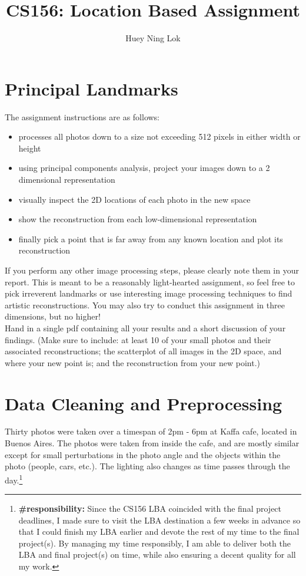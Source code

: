 \documentclass[11pt]{article}
\title{CS156: Location Based Assignment}
\author{Huey Ning Lok}
\providecommand{\tightlist}{%
      \setlength{\itemsep}{0pt}\setlength{\parskip}{0pt}}
\begin{document}
    
    
    \maketitle
    
    

    
    \section{Principal Landmarks}

The assignment instructions are as follows:

\begin{itemize}
\tightlist
\item
  processes all photos down to a size not exceeding 512 pixels in either
  width or height
\item
  using principal components analysis, project your images down to a 2
  dimensional representation
\item
  visually inspect the 2D locations of each photo in the new space
\item
  show the reconstruction from each low-dimensional representation
\item
  finally pick a point that is far away from any known location and plot
  its reconstruction
\end{itemize}

If you perform any other image processing steps, please clearly note
them in your report. This is meant to be a reasonably light-hearted
assignment, so feel free to pick irreverent landmarks or use interesting
image processing techniques to find artistic reconstructions. You may
also try to conduct this assignment in three dimensions, but no higher!\\

Hand in a single pdf containing all your results and a short discussion
of your findings. (Make sure to include: at least 10 of your small
photos and their associated reconstructions; the scatterplot of all
images in the 2D space, and where your new point is; and the
reconstruction from your new point.)
\newpage
   \section{ Data Cleaning and Preprocessing}

Thirty photos were taken over a timespan of 2pm - 6pm at Kaffa cafe,
located in Buenos Aires. The photos were taken from inside the cafe, and
are mostly similar except for small perturbations in the photo angle and
the objects within the photo (people, cars, etc.). The lighting also
changes as time passes through the day.\footnote{\textbf{\#responsibility:} Since the CS156 LBA coincided with the final project deadlines, I made sure to visit the LBA destination a few weeks in advance so that I could finish my LBA earlier and devote the rest of my time to the final project(s). By managing my time responsibly, I am able to deliver both the LBA and final project(s) on time, while also ensuring a decent quality for all my work.}\\
\end{document}
